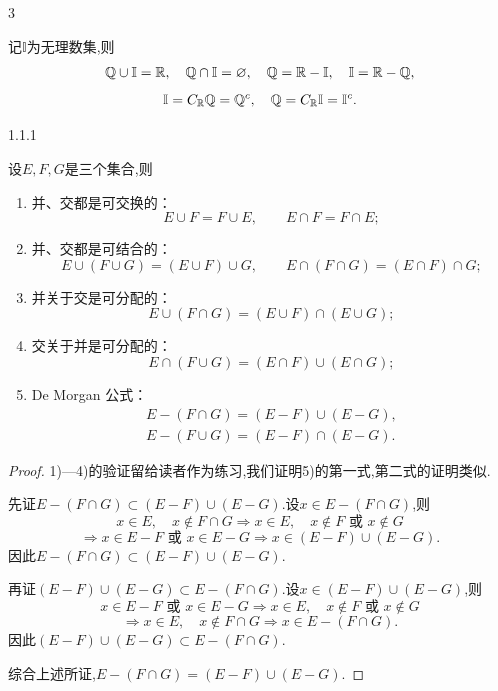 \begin{sourceexample}{3}
	
	记$\mathbb{I}$为无理数集,则 \[\mathbb{Q}\cup\mathbb{I} = \mathbb{R},\quad \mathbb{Q}\cap \mathbb{I}=\varnothing,\quad \mathbb{Q}=\mathbb{R}-\mathbb{I},\quad \mathbb{I}=\mathbb{R}-\mathbb{Q},\] \[\mathbb{I}={C}_{\mathbb{R}}\mathbb{Q}=\mathbb{Q}^c,\quad \mathbb{Q}=C_{\mathbb{R}}\mathbb{I}=\mathbb{I}^c.\]
	
\end{sourceexample}

\begin{mythm*}{1.1.1}
	
	设$E,F,G$是三个集合,则
	
	\begin{enumerate}[label=\arabic{enumi})]
		\item 并、交都是可交换的：
		\[
		E\cup F=F\cup E,\qquad
		E\cap F=F\cap E;
		\]
		
		\item 并、交都是可结合的：
		\[
		E\cup(F\cup G)=(E\cup F)\cup G,\qquad
		E\cap(F\cap G)=(E\cap F)\cap G;
		\]
		
		\item 并关于交是可分配的：
		\[
		E\cup(F\cap G)=(E\cup F)\cap(E\cup G);
		\]
		
		\item 交关于并是可分配的：
		\[
		E\cap(F\cup G)=(E\cap F)\cup(E\cap G);
		\]
		
		\item De Morgan 公式：
		\begin{gather*}
			E-(F\cap G)=(E-F)\cup(E-G),\\
			E-(F\cup G)=(E-F)\cap(E-G).
		\end{gather*}
	\end{enumerate}
	
\end{mythm*}

\begin{proof}
	
	1)---4)的验证留给读者作为练习,我们证明5)的第一式,第二式的证明类似.
	
	先证\(E-(F\cap G)\subset(E-F)\cup(E-G)\).设\(x\in E-(F\cap G)\),则 \[x\in E,\quad x\notin F\cap G
	\Longrightarrow x\in E,\quad x\notin F\text{ 或 }x\notin G\] \[\Longrightarrow x\in E-F\text{ 或 }x\in E-G
	\Longrightarrow x\in(E-F)\cup(E-G).\] 因此\(E-(F\cap G)\subset(E-F)\cup(E-G)\).
	
	再证\((E-F)\cup(E-G)\subset E-(F\cap G)\).设\(x\in(E-F)\cup(E-G)\),则 \[x\in E-F\text{ 或 }x\in E-G
	\Longrightarrow x\in E,\quad x\notin F\text{ 或 }x\notin G\] \[\Longrightarrow x\in E,\quad x\notin F\cap G
	\Longrightarrow x\in E-(F\cap G).\] 因此\((E-F)\cup(E-G)\subset E-(F\cap G)\).
	
	综合上述所证,\(E-(F\cap G)=(E-F)\cup(E-G)\).
	
\end{proof}

